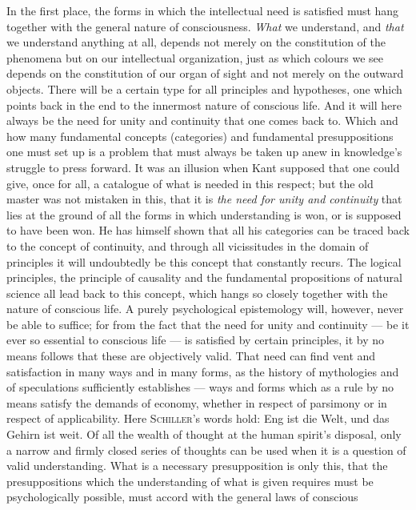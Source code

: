 \documentclass[12pt,a4paper]{book}
\newcommand{\opage}[1]{\marginnote{\footnotesize\textit{[#1]}}}
\begin{document}
In the first place, the forms in which the intellectual need is satisfied must
hang together with the general nature of consciousness. \emph{What} we
understand, and \emph{that} we understand anything at all, depends not merely on
the constitution of the phenomena but on our intellectual organization, just as
which colours we see depends on the constitution of our organ of sight and not
merely on the outward objects. There will be a certain type for all principles
and hypotheses, one which points back in the end to the innermost nature of
conscious life. And it will here always be the need for unity and continuity
that one comes back to. Which and how many fundamental concepts (categories) and
fundamental presuppositions one must set up is a problem that must always be
taken up anew in knowledge's struggle to press forward. It was an illusion when
Kant supposed that one could give, once for all, a catalogue of what is needed in
this respect; but the old master was not mistaken in this, that it is \emph{the
need for unity and continuity} that lies at the ground of all the forms in which
understanding is won, or is supposed to have been won. He has himself shown that
all his categories can be traced back to the concept of continuity, and through
all vicissitudes in the domain of principles it will undoubtedly be this concept
that constantly recurs. The logical principles, the principle of causality and
the fundamental propositions of natural science all lead back to this concept,
which hangs so closely together with the nature of conscious life. A \opage{35}purely
psychological epistemology will, however, never be able to suffice; for from the
fact that the need for unity and continuity --- be it ever so essential to
conscious life --- is satisfied by certain principles, it by no means follows
that these are objectively valid. That need can find vent and satisfaction in
many ways and in many forms, as the history of mythologies and of speculations
sufficiently establishes --- ways and forms which as a rule by no means satisfy
the demands of economy, whether in respect of parsimony or in respect of
applicability. Here \textsc{Schiller}'s words hold: Eng ist die Welt, und das
Gehirn ist weit. Of all the wealth of thought at the human spirit's disposal,
only a narrow and firmly closed series of thoughts can be used when it is a
question of valid understanding. What is a necessary presupposition is only
this, that the presuppositions which the understanding of what is given requires
must be psychologically possible, must accord with the general laws of conscious
\end{document}
